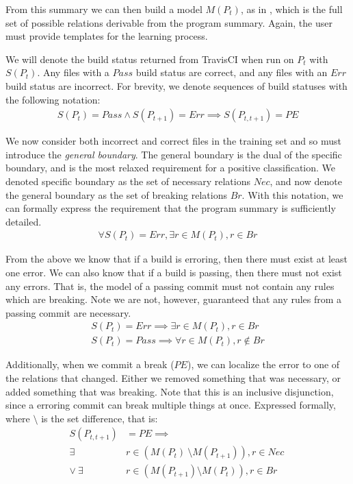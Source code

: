From this summary we can then build a model $M(P_t)$, as in \app,
which is the full set of possible relations derivable 
from the program summary.
Again, the user must provide templates for the learning process.

We will denote the build status returned from TravisCI when run on $P_t$ with $S(P_t)$.
Any files with a $Pass$ build status are correct, and any files with an $Err$ build status are incorrect.
For brevity, we denote sequences of build statuses with the following notation:
\begin{align*}
  S(P_t)=Pass \land S(P_{t+1})=Err \implies S(P_{t,t+1}) = PE
\end{align*}

We now consider both incorrect and correct files in the training set 
and so must introduce the \textit{general boundary}.
The general boundary is the dual of the specific boundary, and is the most relaxed requirement for a positive classification.
We denoted specific boundary as the set of necessary relations $Nec$, and now denote the general boundary as the set of breaking relations $Br$.
With this notation, we can formally express the requirement that the program summary is sufficiently detailed.
\begin{align}
  \forall S(P_t)=Err, \exists r \in M(P_t), r \in Br \label{eq:E1}
\end{align}

From the above we know that if a build is erroring, then there must exist at least one error.
We can also know that if a build is passing, then there must not exist any errors.
That is, the model of a passing commit must not contain any rules which are breaking.
Note we are not, however, guaranteed that any rules from a passing commit are necessary.
\begin{align}
  S(P_t) = Err \implies \exists r \in  M (P_t), r \in Br \label{eq:E}\\
  S(P_t) = Pass \implies \forall r \in  M (P_t), r \notin Br \label{eq:P}
\end{align}

Additionally, when we commit a break ($PE$), we can localize the error to one of the relations that changed.
Either we removed something that was necessary, or added something that was breaking.
Note that this is an inclusive disjunction, since a erroring commit can break multiple things at once.
Expressed formally, where $\setminus$ is the set difference, that is:
\begin{align}
  S(P_{t,t+1}) &= PE \implies \nonumber \\
  \exists& r \in (M(P_{t})\ \setminus M(P_{t+1})), r \in Nec\ \nonumber \\
  \lor \ \exists& r \in (M(P_{t+1}) \setminus M(P_{t})), r \in Br \label{eq:PE}
\end{align}

